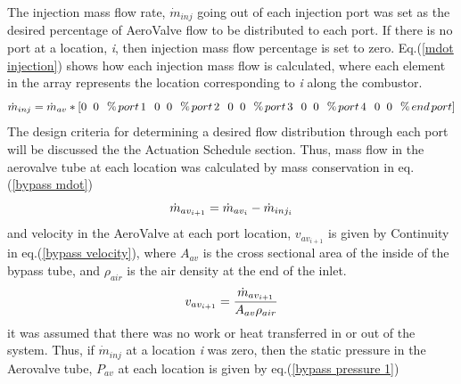 The injection mass flow rate, \(\dot{m}_{inj}\) going out of each injection port was set as the desired percentage of AeroValve flow to be distributed to each port. If there is no port at a location, \textit{i}, then injection mass flow percentage is set to zero. Eq.(\ref{mdot injection}) shows how each injection mass flow is calculated, where each element in the array represents the location corresponding to \textit{i} along the combustor.  
\begin{equation}
    \centering
\dot{m}_{inj}= \dot{m}_{av}*
[0 \hspace{2mm} 0 \hspace{2.5mm} \% \hspace{0.5mm} port \hspace{0.5mm} 1 \hspace{2.5mm}
 0 \hspace{2mm} 0 \hspace{2.5mm} \% \hspace{0.5mm} port \hspace{0.5mm} 2 \hspace{2.5mm}
 0 \hspace{2mm} 0 \hspace{2.5mm} \% \hspace{0.5mm} port \hspace{0.5mm} 3 \hspace{2.5mm}
 0 \hspace{2mm} 0 \hspace{2.5mm} \% \hspace{0.5mm} port \hspace{0.5mm} 4 \hspace{2.5mm} 
 0 \hspace{2mm} 0 \hspace{2.5mm} \% \hspace{0.5mm} end  \hspace{0.5mm} port]
 \label{mdot injection}
\end{equation}
The design criteria for determining a desired flow distribution through each port will be discussed the the Actuation Schedule section.
Thus, mass flow in the aerovalve tube at each location was calculated by mass conservation in eq.(\ref{bypass mdot})
\begin{equation}
    \centering
    \dot{m}_{av_{i+1}}= \dot{m}_{av_{i}}- \dot{m}_{inj_{i}}
     \label{bypass mdot}
\end{equation}
and velocity in the AeroValve at each port location, \(v_{av_{i+1}}\) is given by Continuity in eq.(\ref{bypass velocity}), where \(A_{av}\) is the cross sectional area of the inside of the bypass tube, and \(\rho_{air}\) is the air density at the end of the inlet.  
\begin{equation}
    \centering
    v_{av_{i+1}}= \frac{\dot{m}_{av_{i+1}}}{A_{av}\rho_{air}}
    \label{bypass velocity}
\end{equation}
it was assumed that there was no work or heat transferred in or out of the system. Thus, if \(\dot{m}_{inj}\) at a location \textit{i} was zero, then the static pressure in the Aerovalve tube, \(P_{av}\) at each location is given by eq.(\ref{bypass pressure 1})

